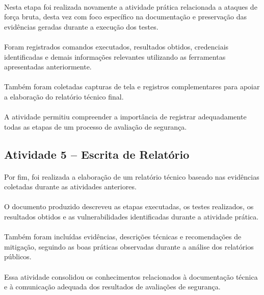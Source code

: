 \paragraph{}
Nesta etapa foi realizada novamente a atividade prática relacionada a ataques
de força bruta, desta vez com foco específico na documentação e preservação das
evidências geradas durante a execução dos testes.

\paragraph{}
Foram registrados comandos executados, resultados obtidos, credenciais
identificadas e demais informações relevantes utilizando as ferramentas
apresentadas anteriormente.

\paragraph{}
Também foram coletadas capturas de tela e registros complementares para apoiar
a elaboração do relatório técnico final.

\paragraph{}
A atividade permitiu compreender a importância de registrar adequadamente todas
as etapas de um processo de avaliação de segurança.

\subsection{Atividade 5 -- Escrita de Relatório}

\paragraph{}
Por fim, foi realizada a elaboração de um relatório técnico baseado nas
evidências coletadas durante as atividades anteriores.

\paragraph{}
O documento produzido descreveu as etapas executadas, os testes realizados, os
resultados obtidos e as vulnerabilidades identificadas durante a atividade
prática.

\paragraph{}
Também foram incluídas evidências, descrições técnicas e recomendações de
mitigação, seguindo as boas práticas observadas durante a análise dos
relatórios públicos.

\paragraph{}
Essa atividade consolidou os conhecimentos relacionados à documentação técnica
e à comunicação adequada dos resultados de avaliações de segurança.
